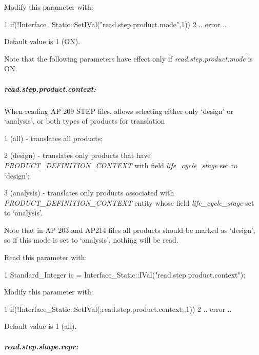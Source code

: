 Modify this parameter with\+: 
\begin{DoxyCode}
1 if(!Interface\_Static::SetIVal("read.step.product.mode",1))  
2 .. error .. 
\end{DoxyCode}
 Default value is 1 (ON).

Note that the following parameters have effect only if {\itshape read.\+step.\+product.\+mode} is ON.

\subparagraph*{read.\+step.\+product.\+context\+:}

When reading AP 209 S\+T\+EP files, allows selecting either only ‘design’ or ‘analysis’, or both types of products for translation
\begin{DoxyItemize}
\item 1 (all) -\/ translates all products;
\item 2 (design) -\/ translates only products that have {\itshape P\+R\+O\+D\+U\+C\+T\+\_\+\+D\+E\+F\+I\+N\+I\+T\+I\+O\+N\+\_\+\+C\+O\+N\+T\+E\+XT} with field {\itshape life\+\_\+cycle\+\_\+stage} set to ‘design’;
\item 3 (analysis) -\/ translates only products associated with {\itshape P\+R\+O\+D\+U\+C\+T\+\_\+\+D\+E\+F\+I\+N\+I\+T\+I\+O\+N\+\_\+\+C\+O\+N\+T\+E\+XT} entity whose field {\itshape life\+\_\+cycle\+\_\+stage} set to ‘analysis’.
\end{DoxyItemize}

Note that in AP 203 and A\+P214 files all products should be marked as ‘design’, so if this mode is set to ‘analysis’, nothing will be read.

Read this parameter with\+: 
\begin{DoxyCode}
1 Standard\_Integer ic =  Interface\_Static::IVal("read.step.product.context");
\end{DoxyCode}


Modify this parameter with\+: 
\begin{DoxyCode}
1 if(!Interface\_Static::SetIVal(;read.step.product.context;,1))  
2 .. error .. 
\end{DoxyCode}
 Default value is 1 (all).

\subparagraph*{read.\+step.\+shape.\+repr\+:}

